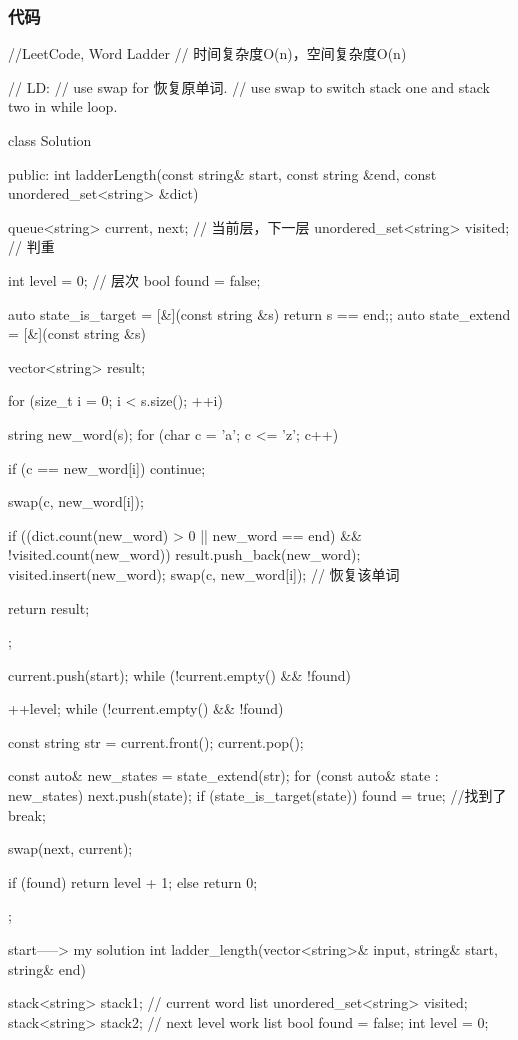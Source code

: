 \subsubsection{代码}
\begin{Code}
//LeetCode, Word Ladder
// 时间复杂度O(n)，空间复杂度O(n)

// LD:
// use swap for 恢复原单词.
// use swap to switch stack one and stack two in while loop.

class Solution {
public:
    int ladderLength(const string& start, const string &end,
            const unordered_set<string> &dict) {
        queue<string> current, next;    // 当前层，下一层
        unordered_set<string> visited;  // 判重

        int level = 0;  // 层次
        bool found = false;

        auto state_is_target = [&](const string &s) {return s == end;};
        auto state_extend = [&](const string &s) {
            vector<string> result;

            for (size_t i = 0; i < s.size(); ++i) {
                string new_word(s);
                for (char c = 'a'; c <= 'z'; c++) {
                    if (c == new_word[i]) continue;

                    swap(c, new_word[i]);

                    if ((dict.count(new_word) > 0 || new_word == end) &&
                            !visited.count(new_word)) {
                        result.push_back(new_word);
                        visited.insert(new_word);
                    }
                    swap(c, new_word[i]); // 恢复该单词
                }
            }

            return result;
        };

        current.push(start);
        while (!current.empty() && !found) {
            ++level;
            while (!current.empty() && !found) {
                const string str = current.front();
                current.pop();

                const auto& new_states = state_extend(str);
                for (const auto& state : new_states) {
                    next.push(state);
                    if (state_is_target(state)) {
                        found = true; //找到了
                        break;
                    }
                }
            }
            swap(next, current);
        }
        if (found) return level + 1;
        else return 0;
    }
};

start----->  my solution
int ladder_length(vector<string>& input, string& start, string& end){
   stack<string> stack1; // current word list
   unordered_set<string> visited;
   stack<string> stack2;      // next level work list
   bool found = false;
   int level = 0;

}
\end{Code}
